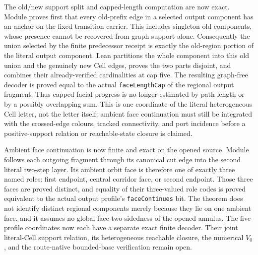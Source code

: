 \documentclass[11pt]{article}
\theoremstyle{definition}
\begin{document}
The old/new support split and capped-length computation are now exact.  Module
proves first that every old-prefix edge in a selected output component has an
anchor on the fixed transition carrier.  This includes singleton old
components, whose presence cannot be recovered from graph support alone.
Consequently the union selected by the finite predecessor receipt is exactly
the old-region portion of the literal output component.  Lean partitions the
whole component into this old union and the genuinely new Cell edges, proves
the two parts disjoint, and combines their already-verified cardinalities at
cap five.  The resulting graph-free decoder is proved equal to the actual
\texttt{faceLengthCap} of the regional output fragment.  Thus capped facial
progress is no longer estimated by path length or by a possibly overlapping
sum.  This is one coordinate of the literal heterogeneous Cell letter, not
the letter itself: ambient face continuation must still be integrated with
the crossed-edge colours, tracked connectivity, and port incidence before a
positive-support relation or reachable-state closure is claimed.

Ambient face continuation is now finite and exact on the opened source.
Module
follows each outgoing fragment through its canonical cut edge into the second
literal two-step layer.  Its ambient orbit face is therefore one of exactly
three named roles: first endpoint, central corridor face, or second endpoint.
Those three faces are proved distinct, and equality of their three-valued
role codes is proved equivalent to the actual output profile's
\texttt{faceContinues} bit.  The theorem does not identify distinct regional
components merely because they lie on one ambient face, and it assumes no
global face-two-sidedness of the opened annulus.  The five profile coordinates
now each have a separate exact finite decoder.  Their joint literal-Cell
support relation, its heterogeneous reachable closure, the numerical $V_0$,
and the route-native bounded-base verification remain open.
\end{document}
